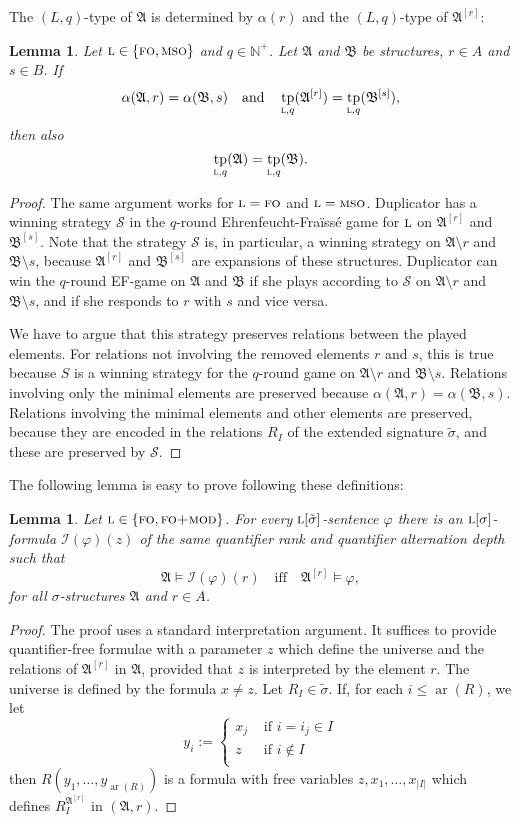 \documentclass[11pt]{article}
\newtheorem{lemma}[theorem]{Lemma}
\renewcommand{\phi}{\varphi}
\newcommand{\logic}[1]{\textsc{#1}}
\newcommand{\logl}{\logic{l}}
\newcommand{\FO}{\logic{fo}}
\newcommand{\FOmod}{\logic{fo+mod}}
\newcommand{\MSO}{\logic{mso}}
\newcommand{\ar}{\operatorname{ar}}
\newcommand{\I}{\mathcal{I}}
\DeclareMathOperator{\tp}{tp}
\newcommand{\struct}[1]{\mathfrak{#1}}
\newcommand{\AS}{\struct{A}}
\newcommand{\BS}{\struct{B}}
\newcommand{\set}[1]{\{#1\}}
\newcommand{\Npos}{\mathbb{N}^{+}}
\begin{document}
The $(L,q)$-type of $\AS$ is determined by $\alpha(r)$ and the
$(L,q)$-type of $\AS^{[r]}$:
\begin{lemma}
  \label{lem:IndASrtoAS}
  Let $\logl\in \set{\FO{}, \MSO{}}$ and $q\in \Npos$. Let $\AS$ and $\BS$ be
  structures, $r \in A$ and $s \in B$. If
  \[
  \alpha(\AS,r) = \alpha(\BS,s)
  \quad\text{and}\quad
  \tp_{\logl,q}(\AS^{[r]}) = \tp_{\logl,q}(\BS^{[s]}),
  \]
  then also
  \[
  \tp_{\logl,q}(\AS) = \tp_{\logl,q}(\BS).
  \]
\end{lemma}
\begin{proof}
  The same argument works for $\logl=\FO{}$ and $\logl=\MSO{}$.
  Duplicator has a winning strategy $\mathcal{S}$ in the $q$-round
  Ehrenfeucht-Fra\"iss\'e game for $\logl$ on $\AS^{[r]}$ and
  $\BS^{[s]}$. Note that the strategy $\mathcal{S}$ is, in particular,
  a winning strategy on $\AS \setminus r$ and $\BS \setminus s$,
  because $\AS^{[r]}$ and $\BS^{[s]}$ are expansions of these
  structures. Duplicator can win the $q$-round EF-game on $\AS$ and
  $\BS$ if she plays according to $\mathcal{S}$ on $\AS \setminus r$
  and $\BS \setminus s$, and if she responds to $r$ with $s$ and vice
  versa.

  We have to argue that this strategy preserves relations between the
  played elements. For relations not involving the removed elements
  $r$ and $s$, this is true because $S$ is a winning strategy for the
  $q$-round game on $\AS \setminus r$ and $\BS \setminus s$. Relations
  involving only the minimal elements are preserved because
  $\alpha(\AS,r) = \alpha(\BS,s)$. Relations involving the minimal
  elements and other elements are preserved, because they are encoded
  in the relations $R_I$ of the extended signature $\tilde \sigma$,
  and these are preserved by $\mathcal S$.
\end{proof}

The following lemma is easy to prove following these definitions:
\begin{lemma}
  \label{lem:ASrtoAS}
  Let $\logl\in \set{\FO{}, \FOmod{}}$.  For every $\logl[\tilde
  \sigma]$-sentence $\phi$ there is an $\logl[\sigma]$-formula
  $\I(\varphi)(z)$ of the same quantifier rank and quantifier
  alternation depth such that
  \[
  \AS \models \I(\phi)(r) \quad\text{iff}\quad \AS^{[r]} \models \phi,
  \]
  for all $\sigma$-structures $\AS$ and $r \in A$.
\end{lemma}
\begin{proof}
  The proof uses a standard interpretation argument.  It suffices to
  provide quantifier-free formulae with a parameter $z$ which define
  the universe and the relations of $\AS^{[r]}$ in $\AS$, provided
  that $z$ is interpreted by the element $r$. The universe is defined
  by the formula $x \neq z$. Let $R_I\in \tilde\sigma$. If, for each $i\leq
  \ar(R)$, we let 
  \[ y_i :=
  \begin{cases}
    x_j & \text{ if } i=i_j\in I\\
    z & \text{ if } i\notin I\\
  \end{cases}
  \]
  then $R(y_1, \ldots, y_{\ar(R)})$ is a formula with free variables
  $z,x_1,\ldots,x_{|I|}$ which defines $R_I^{\AS^{[r]}}$ in $(\AS,r)$.
\end{proof}
\end{document}
